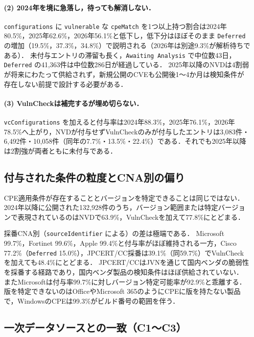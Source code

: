 \paragraph{(2) 2024年を境に急落し，待っても解消しない．}
\texttt{configurations} に \texttt{vulnerable} な \texttt{cpeMatch} を1つ以上持つ割合は2024年80.5\%，2025年62.6\%，2026年56.1\%と低下し，低下分はほぼそのまま \texttt{Deferred} の増加（19.5\%，37.3\%，34.8\%）で説明される（2026年は別途9.3\%が解析待ちである）．
未付与エントリの滞留も長く，\texttt{Awaiting Analysis} で中位数43日，\texttt{Deferred} の41,363件は中位数286日が経過している．
2025年以降のNVDは4割弱が将来にわたって供給されず，新規公開のCVEも公開後1〜4か月は検知条件が存在しない前提で設計する必要がある．

\paragraph{(3) VulnCheckは補完するが埋め切らない．}
\texttt{vcConfigurations} を加えると付与率は2024年88.3\%，2025年76.1\%，2026年78.5\%へ上がり，NVDが付与せずVulnCheckのみが付与したエントリは3,083件・6,492件・10,058件（同年の7.7\%・13.5\%・22.4\%）である．それでも2025年以降は2割強が両者ともに未付与である．

\subsection{付与された条件の粒度とCNA別の偏り}
\label{sec:grain}

CPE適用条件が存在することとバージョンを特定できることは同じではない．
2024年以降に公開された132,928件のうち，バージョン範囲または特定バージョンで表現されているのはNVDで63.9\%，VulnCheckを加えて77.8\%にとどまる．

採番CNA別（\texttt{sourceIdentifier} による）の差は極端である．
Microsoft 99.7\%，Fortinet 99.6\%，Apple 99.4\%と付与率がほぼ維持される一方，Cisco 77.2\%（\texttt{Deferred} 15.0\%），JPCERT/CC採番は39.1\%（同59.7\%）でVulnCheckを加えても48.4\%にとどまる．
JPCERT/CCはJVNを通じて国内ベンダの脆弱性を採番する経路であり，国内ベンダ製品の検知条件はほぼ供給されていない．
またMicrosoftは付与率99.7\%に対しバージョン特定可能率が92.9\%と乖離する．版を特定できないのはOfficeやMicrosoft 365のようにCPEに版を持たない製品で，WindowsのCPEは99.3\%がビルド番号の範囲を伴う．

\subsection{一次データソースとの一致（C1〜C3）}
\label{sec:c1c3}

